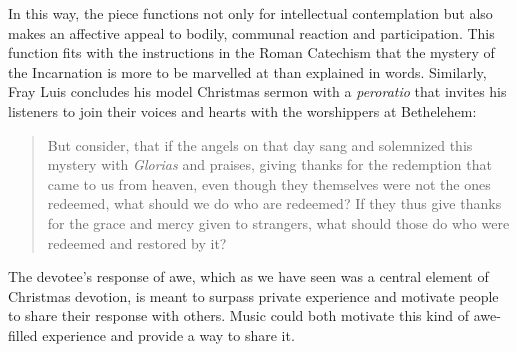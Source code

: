 In this way, the piece functions not only for intellectual contemplation but
also makes an affective appeal to bodily, communal reaction and participation.
This function fits with the instructions in the Roman Catechism that the mystery
of the Incarnation is more to be marvelled at than explained in words.
Similarly, Fray Luis concludes his model Christmas sermon with a
\emph{peroratio} that invites his listeners to join their voices and hearts with
the worshippers at Bethelehem:
\begin{quote}
    But consider, that if the angels on that day sang and solemnized this
    mystery with \emph{Glorias} and praises, giving thanks 
    for the redemption that came to us from heaven, even though they themselves
    were not the ones redeemed, what should we do who are redeemed?
    If they thus give thanks for the grace  and mercy given
    to strangers, what should those do who were redeemed and restored by it?%
    \Autocite
    [41: ]
    {LuisdeGranada:Xmas}
\end{quote}
The devotee's response of awe, which as we have seen was a central element of
Christmas devotion, is meant to surpass private experience and motivate people
to share their response with others.
Music could both motivate this kind of awe-filled experience and provide a way
to share it.

